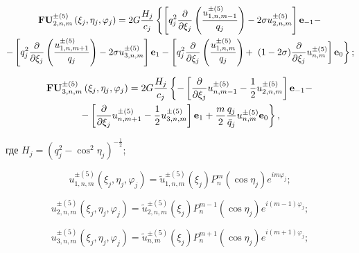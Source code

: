 \begin{multline}
{\bf{FU}}_{2,n,m}^{ \pm (5)}\left( {{\xi _j},{\eta _j},{\varphi _j}} \right) = 2G\frac{{{H_j}}}{{{c_j}}}\left\{ {\left[ {q_j^2\frac{\partial }{{\partial {\xi _j}}}\left( {\frac{{u_{1,n,m - 1}^{ \pm (5)}}}{{{q_j}}}} \right) - 2\sigma u_{2,n,m}^{ \pm (5)}} \right]{{\bf{e}}_{ - 1}} - } \right.\\
- \left[ {q_j^2\frac{\partial }{{\partial {\xi _j}}}\left( {\frac{{u_{1,n,m + 1}^{ \pm (5)}}}{{{q_j}}}} \right) - 2\sigma u_{3,n,m}^{ \pm (5)}} \right]{{\bf{e}}_1} - \left[ {q_j^2\frac{\partial }{{\partial {\xi _j}}}\left( {\frac{{u_{1,n,m}^{ \pm (5)}}}{{{q_j}}}} \right) + } \right.\left. {\left. {(1 - 2\sigma )\frac{\partial }{{\partial {\xi _j}}}u_{n,m}^{ \pm (5)}} \right]{{\bf{e}}_0}} \right\};
\label{eq:9:f2}
\end{multline}

\begin{multline}
{\bf{FU}}_{3,n,m}^{ \pm (5)}\left( {{\xi _j},{\eta _j},{\varphi _j}} \right) = 2G\frac{{{H_j}}}{{{c_j}}}\left\{ { - \left[ {\frac{\partial }{{\partial {\xi _j}}}u_{n,m - 1}^{ \pm (5)} - \frac{1}{2}u_{2,n,m}^{ \pm (5)}} \right]{{\bf{e}}_{ - 1}} - } \right.\\
\left. { - \left[ {\frac{\partial }{{\partial {\xi _j}}}u_{n,m + 1}^{ \pm (5)} - \frac{1}{2}u_{3,n,m}^{ \pm (5)}} \right]{{\bf{e}}_1} + \frac{m}{2}\frac{{{q_j}}}{{{{\bar q}_j}}}u_{n,m}^{ \pm (5)}{{\bf{e}}_0}} \right\},
\label{eq:9:f3}
\end{multline}

\noindent где ${H_j} = {\left( {q_j^2 - {{\cos }^2}{\eta _j}} \right)^{ - \frac{1}{2}}}$;

\begin{equation}
u_{1,n,m}^{ \pm (5)}\left( {{\xi _j},{\eta _j},{\varphi _j}} \right) = \tilde u_{1,n,m}^{ \pm (5)}({\xi _j})P_n^m(\cos {\eta _j}){e^{im{\varphi _j}}};
\end{equation}

\begin{equation}
u_{2,n,m}^{ \pm (5)}\left( {{\xi _j},{\eta _j},{\varphi _j}} \right) = \tilde u_{2,n,m}^{ \pm (5)}({\xi _j})P_n^{m - 1}(\cos {\eta _j}){e^{i(m - 1){\varphi _j}}};
\end{equation}

\begin{equation}
u_{3,n,m}^{ \pm (5)}\left( {{\xi _j},{\eta _j},{\varphi _j}} \right) = \tilde u_{n,m}^{ \pm (5)}({\xi _j})P_n^{m + 1}(\cos {\eta _j}){e^{i(m + 1){\varphi _j}}};
\end{equation}


